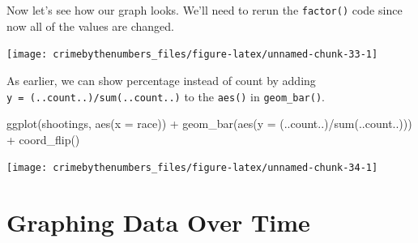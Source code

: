 \documentclass[
]{krantz}
\makeatletter
\newenvironment{Shaded}{\begin{snugshade}}{\end{snugshade}}
\newcommand{\AttributeTok}[1]{\textcolor[rgb]{0.61,0.61,0.61}{#1}}
\newcommand{\ConstantTok}[1]{\textcolor[rgb]{0,0,0}{#1}}
\newcommand{\FunctionTok}[1]{\textcolor[rgb]{0,0,0}{#1}}
\newcommand{\NormalTok}[1]{#1}
\newcommand{\OtherTok}[1]{\textcolor[rgb]{0.37,0.37,0.37}{#1}}
\newcommand{\SpecialCharTok}[1]{\textcolor[rgb]{0,0,0}{#1}}
\newenvironment{kframe}{%
\medskip{}
\setlength{\fboxsep}{.8em}
 \def\at@end@of@kframe{}%
 \ifinner\ifhmode%
  \def\at@end@of@kframe{\end{minipage}}%
  \begin{minipage}{\columnwidth}%
 \fi\fi%
 \def\FrameCommand##1{\hskip\@totalleftmargin \hskip-\fboxsep
 \colorbox{shadecolor}{##1}\hskip-\fboxsep
     \hskip-\linewidth \hskip-\@totalleftmargin \hskip\columnwidth}%
 \MakeFramed {\advance\hsize-\width
   \@totalleftmargin\z@ \linewidth\hsize
   \@setminipage}}%
 {\par\unskip\endMakeFramed%
 \at@end@of@kframe}
\renewenvironment{Shaded}{\begin{kframe}}{\end{kframe}}
\makeatother
\begin{document}
Now let's see how our graph looks. We'll need to rerun the \texttt{factor()} code since now all of the values are changed.

\begin{Shaded}
\end{Shaded}

\begin{center}\texttt{[image: crimebythenumbers\_files/figure-latex/unnamed-chunk-33-1]} \end{center}

As earlier, we can show percentage instead of count by adding \texttt{y\ =\ (..count..)/sum(..count..)} to the \texttt{aes()} in \texttt{geom\_bar()}.

\begin{Shaded}
\begin{Highlighting}[]
\FunctionTok{ggplot}\NormalTok{(shootings, }\FunctionTok{aes}\NormalTok{(}\AttributeTok{x =}\NormalTok{ race)) }\SpecialCharTok{+} \FunctionTok{geom\_bar}\NormalTok{(}\FunctionTok{aes}\NormalTok{(}\AttributeTok{y =}\NormalTok{ (..count..)}\SpecialCharTok{/}\FunctionTok{sum}\NormalTok{(..count..))) }\SpecialCharTok{+}
  \FunctionTok{coord\_flip}\NormalTok{()}
\end{Highlighting}
\end{Shaded}

\begin{center}\texttt{[image: crimebythenumbers\_files/figure-latex/unnamed-chunk-34-1]} \end{center}

\hypertarget{graphing-data-over-time}{%
\section{Graphing Data Over Time}\label{graphing-data-over-time}}
\end{document}
